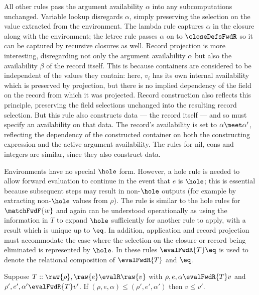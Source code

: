  All other rules pass the argument availability $\alpha$ into any subcomputations unchanged. Variable lookup disregards $\alpha$, simply preserving the selection on the value extracted from the environment. The lambda rule captures $\alpha$ in the closure along with the environment; the letrec rule passes $\alpha$ on to $\closeDefsFwdR$ so it can be captured by recursive closures as well. Record projection is more interesting, disregarding not only the argument availability $\alpha$ but also the availability $\beta$ of the record itself. This is because containers are considered to be independent of the values they contain: here, $v_i$ has its own internal availability which is preserved by projection, but there is no implied dependency of the field on the record from which it was projected. Record construction also reflects this principle, preserving the field selections unchanged into the resulting record selection. But this rule also constructs data --- the record itself --- and so must specify an availability on that data. The record's availability is set to $\alpha \meet \alpha'$, reflecting the dependency of the constructed container on both the constructing expression and the active argument availability. The rules for nil, cons and integers are similar, since they also construct data.

 Environments have no special $\hole$ form. However, a hole rule is needed to allow forward evaluation to continue in the event that $e$ is $\hole$; this is essential because subsequent steps may result in non-$\hole$ outputs (for example by extracting non-$\hole$ values from $\rho$). The rule is similar to the hole rules for $\matchFwdF{w}$ and again can be understood operationally as using the information in $T$ to expand $\hole$ sufficiently for another rule to apply, with a result which is unique up to $\eq$. In addition, application and record projection must accommodate the case where the selection on the closure or record being eliminated is represented by $\hole$. In these rules $\evalFwdR{T}\eq$ is used to denote the relational composition of $\evalFwdR{T}$ and $\eq$.

\begin{lemma}
   Suppose $T :: \raw{\rho}, \raw{e} \evalR \raw{v}$ with $\rho, e, \alpha \evalFwdR{T} v$ and $\rho', e', \alpha' \evalFwdR{T} v'$. If $(\rho, e, \alpha) \leq (\rho', e', \alpha')$ then $v \leq v'$.
\end{lemma}

